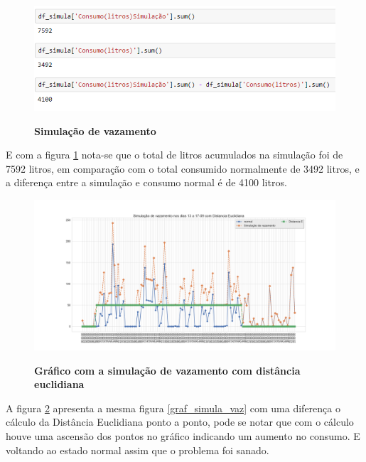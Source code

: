 \begin{figure}[ht]
	\caption{\textbf{Simulação de vazamento}}
	\centering
		\includegraphics[width=\textwidth,height=\textheight , keepaspectratio]{figuras/somaediferencadasimulacao}
		\label{simula_vaz}
\end{figure}

\par E com a figura \ref{simula_vaz} nota-se que o total de litros acumulados na simulação foi de 7592 litros, em comparação com o total consumido normalmente de 3492 litros, e a diferença entre a simulação e consumo normal é de 4100 litros.

\begin{figure}[ht]
	\caption{\textbf{Gráfico com a simulação de vazamento com distância euclidiana}}
	\centering
		\includegraphics[width=\textwidth,height=\textheight , keepaspectratio]{figuras/Simulacaodevazamentonosdias13a17-09comDistanciaEuclidiana}
		\label{graf_simula_vaz_d}
\end{figure}

\par A figura \ref{graf_simula_vaz_d} apresenta a mesma figura \ref{graf_simula_vaz} com uma diferença o cálculo da Distância Euclidiana ponto a ponto, pode se notar que com o cálculo houve uma ascensão dos pontos no gráfico indicando um aumento no consumo. E voltando ao estado normal assim que o problema foi sanado.

